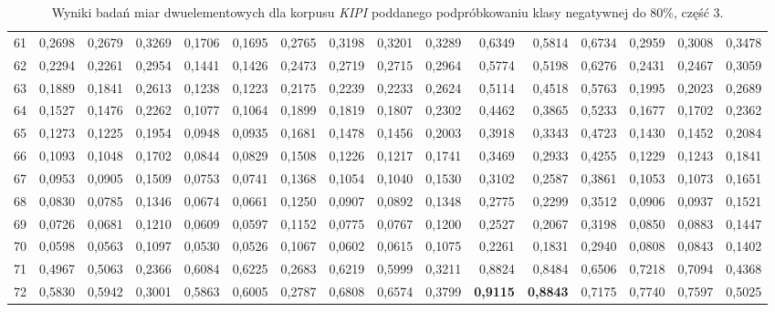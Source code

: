 \begin{table}[htp!]
\begin{adjustwidth}{-2cm}{}
\begin{tabular}{ l | *{15}{| r}}
61	&	0,2698	&	0,2679	&	0,3269	&	0,1706	&	0,1695	&	0,2765	&	0,3198	&	0,3201	&	0,3289	&	0,6349	&	0,5814	&	0,6734	&	0,2959	&	0,3008	&	0,3478	\\
62	&	0,2294	&	0,2261	&	0,2954	&	0,1441	&	0,1426	&	0,2473	&	0,2719	&	0,2715	&	0,2964	&	0,5774	&	0,5198	&	0,6276	&	0,2431	&	0,2467	&	0,3059	\\
63	&	0,1889	&	0,1841	&	0,2613	&	0,1238	&	0,1223	&	0,2175	&	0,2239	&	0,2233	&	0,2624	&	0,5114	&	0,4518	&	0,5763	&	0,1995	&	0,2023	&	0,2689	\\
64	&	0,1527	&	0,1476	&	0,2262	&	0,1077	&	0,1064	&	0,1899	&	0,1819	&	0,1807	&	0,2302	&	0,4462	&	0,3865	&	0,5233	&	0,1677	&	0,1702	&	0,2362	\\
65	&	0,1273	&	0,1225	&	0,1954	&	0,0948	&	0,0935	&	0,1681	&	0,1478	&	0,1456	&	0,2003	&	0,3918	&	0,3343	&	0,4723	&	0,1430	&	0,1452	&	0,2084	\\
66	&	0,1093	&	0,1048	&	0,1702	&	0,0844	&	0,0829	&	0,1508	&	0,1226	&	0,1217	&	0,1741	&	0,3469	&	0,2933	&	0,4255	&	0,1229	&	0,1243	&	0,1841	\\
67	&	0,0953	&	0,0905	&	0,1509	&	0,0753	&	0,0741	&	0,1368	&	0,1054	&	0,1040	&	0,1530	&	0,3102	&	0,2587	&	0,3861	&	0,1053	&	0,1073	&	0,1651	\\
68	&	0,0830	&	0,0785	&	0,1346	&	0,0674	&	0,0661	&	0,1250	&	0,0907	&	0,0892	&	0,1348	&	0,2775	&	0,2299	&	0,3512	&	0,0906	&	0,0937	&	0,1521	\\
69	&	0,0726	&	0,0681	&	0,1210	&	0,0609	&	0,0597	&	0,1152	&	0,0775	&	0,0767	&	0,1200	&	0,2527	&	0,2067	&	0,3198	&	0,0850	&	0,0883	&	0,1447	\\
70	&	0,0598	&	0,0563	&	0,1097	&	0,0530	&	0,0526	&	0,1067	&	0,0602	&	0,0615	&	0,1075	&	0,2261	&	0,1831	&	0,2940	&	0,0808	&	0,0843	&	0,1402	\\
71	&	0,4967	&	0,5063	&	0,2366	&	0,6084	&	0,6225	&	0,2683	&	0,6219	&	0,5999	&	0,3211	&	0,8824	&	0,8484	&	0,6506	&	0,7218	&	0,7094	&	0,4368	\\
72	&	0,5830	&	0,5942	&	0,3001	&	0,5863	&	0,6005	&	0,2787	&	0,6808	&	0,6574	&	0,3799	&	\textbf{0,9115}	&	\textbf{0,8843}	&	0,7175	&	0,7740	&	0,7597	&	0,5025	\\
	\bottomrule
\end{tabular}
 \end{adjustwidth}
\caption[Wyniki badań miar dwuelementowych dla korpusu \emph{KIPI} poddanego podpróbkowaniu klasy negatywnej do 80\%, część 3]{Wyniki badań miar dwuelementowych dla korpusu \emph{KIPI} poddanego podpróbkowaniu klasy negatywnej do 80\%, część 3.}
\label{KIPI_subsampled_20_part_3}
\end{table}

